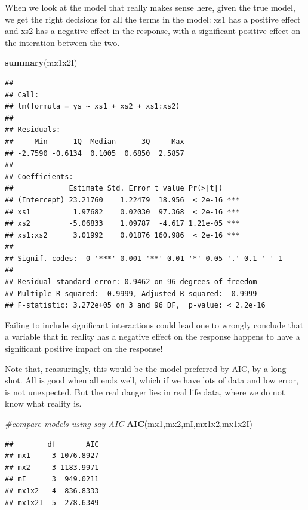 \documentclass[
]{book}
\newenvironment{Shaded}{\begin{snugshade}}{\end{snugshade}}
\newcommand{\CommentTok}[1]{\textcolor[rgb]{0.56,0.35,0.01}{\textit{#1}}}
\newcommand{\KeywordTok}[1]{\textcolor[rgb]{0.13,0.29,0.53}{\textbf{#1}}}
\newcommand{\NormalTok}[1]{#1}
\begin{document}
When we look at the model that really makes sense here, given the true model, we get the right decisions for all the terms in the model: xs1 has a positive effect and xs2 has a negative effect in the response, with a significant positive effect on the interation between the two.

\begin{Shaded}
\begin{Highlighting}[]
\KeywordTok{summary}\NormalTok{(mx1x2I)}
\end{Highlighting}
\end{Shaded}

\begin{verbatim}
## 
## Call:
## lm(formula = ys ~ xs1 + xs2 + xs1:xs2)
## 
## Residuals:
##     Min      1Q  Median      3Q     Max 
## -2.7590 -0.6134  0.1005  0.6850  2.5857 
## 
## Coefficients:
##             Estimate Std. Error t value Pr(>|t|)    
## (Intercept) 23.21760    1.22479  18.956  < 2e-16 ***
## xs1          1.97682    0.02030  97.368  < 2e-16 ***
## xs2         -5.06833    1.09787  -4.617 1.21e-05 ***
## xs1:xs2      3.01992    0.01876 160.986  < 2e-16 ***
## ---
## Signif. codes:  0 '***' 0.001 '**' 0.01 '*' 0.05 '.' 0.1 ' ' 1
## 
## Residual standard error: 0.9462 on 96 degrees of freedom
## Multiple R-squared:  0.9999,	Adjusted R-squared:  0.9999 
## F-statistic: 3.272e+05 on 3 and 96 DF,  p-value: < 2.2e-16
\end{verbatim}

Failing to include significant interactions could lead one to wrongly conclude that a variable that in reality has a negative effect on the response happens to have a significant positive impact on the response!

Note that, reassuringly, this would be the model preferred by AIC, by a long shot. All is good when all ends well, which if we have lots of data and low error, is not unexpected. But the real danger lies in real life data, where we do not know what reality is.

\begin{Shaded}
\begin{Highlighting}[]
\CommentTok{#compare models using say AIC}
\KeywordTok{AIC}\NormalTok{(mx1,mx2,mI,mx1x2,mx1x2I)}
\end{Highlighting}
\end{Shaded}

\begin{verbatim}
##        df       AIC
## mx1     3 1076.8927
## mx2     3 1183.9971
## mI      3  949.0211
## mx1x2   4  836.8333
## mx1x2I  5  278.6349
\end{verbatim}
\end{document}
